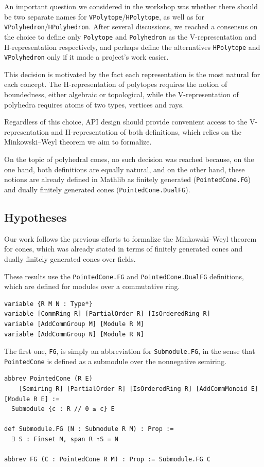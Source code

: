 An important question we considered in the workshop was whether there should be two separate names
for \texttt{VPolytope}/\texttt{HPolytope}, as well as for \texttt{VPolyhedron}/\texttt{HPolyhedron}.
After several discussions, we reached a consensus on the choice
to define only \texttt{Polytope} and \texttt{Polyhedron} as the V-representation and
H-representation respectively, and perhaps define the alternatives \texttt{HPolytope} and
\texttt{VPolyhedron} only if it made a project's work easier.

This decision is motivated by the fact each representation is the most natural for each concept.
The H-representation of polytopes requires the notion of boundedness, either algebraic or
topological, while the V-representation of polyhedra requires atoms of two types, vertices and
rays.

Regardless of this choice, API design should provide convenient access to the V-representation
and H-representation of both definitions, which relies on the Minkowski--Weyl theorem we aim to
formalize.

On the topic of polyhedral cones, no such decision was reached because,
on the one hand, both definitions are equally natural, and on the other hand,
these notions are already defined in Mathlib as finitely generated (\texttt{PointedCone.FG}) and
dually finitely generated cones (\texttt{PointedCone.DualFG}).

\subsection{Hypotheses}
\label{subsec:mw:hypotheses}
Our work follows the previous efforts to formalize the Minkowski--Weyl theorem for cones,
which was already stated in terms of finitely generated cones and dually finitely generated
cones over fields.

These results use the \texttt{PointedCone.FG} and \texttt{PointedCone.DualFG} definitions,
which are defined for modules over a commutative ring.
\begin{lstlisting}
variable {R M N : Type*}
variable [CommRing R] [PartialOrder R] [IsOrderedRing R]
variable [AddCommGroup M] [Module R M]
variable [AddCommGroup N] [Module R N]
\end{lstlisting}

The first one, \texttt{FG}, is simply an abbreviation for \texttt{Submodule.FG},
in the sense that \texttt{PointedCone} is defined as a submodule over the nonnegative semiring.
\begin{lstlisting}
abbrev PointedCone (R E)
    [Semiring R] [PartialOrder R] [IsOrderedRing R] [AddCommMonoid E] [Module R E] :=
  Submodule {c : R // 0 ≤ c} E

def Submodule.FG (N : Submodule R M) : Prop :=
  ∃ S : Finset M, span R ↑S = N

abbrev FG (C : PointedCone R M) : Prop := Submodule.FG C
\end{lstlisting}

